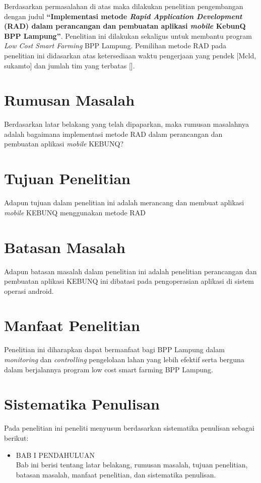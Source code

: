 \begin{flushleft}
\begin{justify}
    Berdasarkan permasalahan di atas maka dilakukan penelitian pengembangan dengan judul \textbf{“Implementasi metode \textit{Rapid Application Development} (RAD) dalam perancangan dan pembuatan aplikasi \textit{mobile} KebunQ BPP Lampung”}.  Penelitian ini dilakukan sekaligus untuk membantu program \textit{Low Cost Smart Farming} BPP Lampung. Pemilihan metode RAD pada penelitian ini didasarkan atas ketersediaan waktu pengerjaan yang pendek [Mcld, sukamto] dan jumlah tim yang terbatas [].
\\

    \section{Rumusan Masalah}
      Berdasarkan latar belakang yang telah dipaparkan, maka rumusan masalahnya adalah bagaimana implementasi metode RAD dalam perancangan dan pembuatan aplikasi \textit{mobile} KEBUNQ?
      \\
    \section{Tujuan Penelitian}
      Adapun tujuan dalam penelitian ini adalah merancang dan membuat aplikasi \textit{mobile} KEBUNQ menggunakan metode RAD
      \\
    \section{Batasan Masalah}
      Adapun batasan masalah dalam penelitian ini adalah penelitian perancangan dan pembuatan aplikasi KEBUNQ ini dibatasi pada pengoperasian aplikasi di sistem operasi android.
      \\
    \section{Manfaat Penelitian}
    Penelitian ini diharapkan dapat bermanfaat bagi BPP Lampung dalam \textit{monitoring} dan \textit{controlling} pengelolaan lahan yang lebih efektif serta berguna dalam berjalannya program low cost smart farming BPP Lampung.
    \\


    \section{Sistematika Penulisan}
    Pada penelitian ini peneliti menyusun berdasarkan sistematika penulisan sebagai berikut: 
      \begin{itemize}
        \item BAB I PENDAHULUAN
        \\
        Bab ini berisi tentang latar belakang, rumusan masalah, tujuan penelitian, 
        batasan masalah, manfaat penelitian, dan sistematika penulisan.


\end{itemize}
\end{justify}
\end{flushleft}
